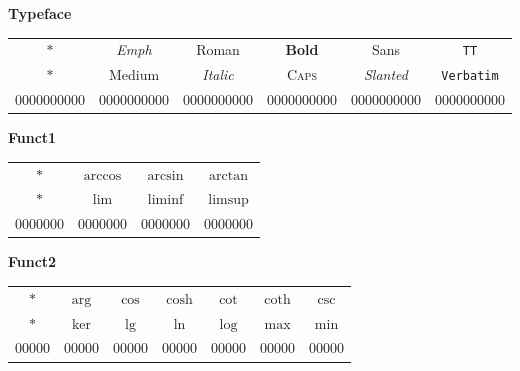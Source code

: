 \documentclass[12pt]{report}
\newlength{\mine}
\newlength{\niz}
\def\pmb{}
\begin{document}
\newpage

\textbf{Typeface}
\par\nobreak\vspace{2mm}
\begin{tabular}{|c|ccccc|}
  \hline
    $\pmb *         $&
    \emph{Emph}      &
    \textrm{Roman}   &
    \textbf{Bold}    &
    \textsf{Sans}    &
    \texttt{TT}      \\[\mine]
    $\pmb *         $&
    \textmd{Medium}  &
    \textit{Italic}  &
    \textsc{Caps}    &
    \textsl{Slanted} &
    \verb"Verbatim"  \\[\niz]
  \hline\hline
  0000000000&0000000000&0000000000&0000000000&0000000000&0000000000\\
  \hline
\end{tabular}
\goodbreak\par\vspace{3mm}

\newpage

\textbf{Funct1}
\par\nobreak\vspace{2mm}
\begin{tabular}{|c|ccc|}
  \hline
   $\pmb *      $&
   $\pmb\arccos $&
   $\pmb\arcsin $&
   $\pmb\arctan $\\[\mine]
   $\pmb *      $&
   $\pmb\lim    $&
   $\pmb\liminf $&
   $\pmb\limsup $\\[\niz]
  \hline\hline
  0000000&0000000&0000000&0000000\\
  \hline
\end{tabular}
\goodbreak\par\vspace{3mm}

\textbf{Funct2}
\par\nobreak\vspace{2mm}
\begin{tabular}{|c|cccccc|}
  \hline
   $\pmb *      $&
   $\pmb\arg    $&
   $\pmb\cos    $&
   $\pmb\cosh   $&
   $\pmb\cot    $&
   $\pmb\coth   $&
   $\pmb\csc    $\\[\mine]
   $\pmb *      $&
   $\pmb\ker    $&
   $\pmb\lg     $&
   $\pmb\ln     $&
   $\pmb\log    $&
   $\pmb\max    $&
   $\pmb\min    $\\[\niz]
  \hline\hline
  00000&00000&00000&00000&00000&00000&00000\\
  \hline
\end{tabular}
\goodbreak\par\vspace{3mm}
\end{document}
